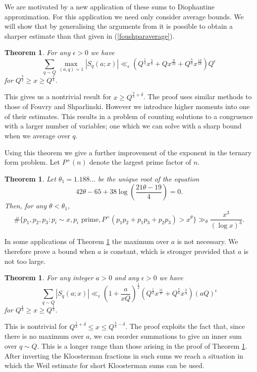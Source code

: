\documentclass[12pt]{article}
\newtheorem{thm}[defn]{Theorem}
\begin{document}
We are motivated by a new application of these sums to Diophantine
approximation.  For this application we need only consider average
bounds.  We will show that by generalising the arguments from
\cite{foushpar} it is possible to obtain a sharper estimate than that
given in (\ref{foushparaverage}).
\begin{thm}\label{thm1}
For any $\epsilon>0$ we have 
$$\sum_{q\sim Q}\max_{(a,q)=1}|S_q(a;x)|\ll_\epsilon (Q^{\frac54}x^{\frac58}+Qx^{\frac{9}{10}}+Q^{\frac76}x^{\frac{13}{18}})Q^\epsilon$$
for $Q^{\frac32}\geq x\geq Q^{\frac23}$.  
\end{thm}

This gives us a nontrivial result for $x\geq Q^{\frac23+\delta}$.  The
proof uses similar methods to those of Fouvry and Shparlinski.
However we introduce higher moments into
one of their estimates.  This results in a problem of counting solutions to a congruence with a larger number of variables; one which we  can solve with a sharp bound when we average over $q$.

Using this theorem we give a further improvement of the exponent in the ternary form problem.  Let $P^+(n)$ denote the largest prime factor of $n$.

\begin{thm}\label{ternary}
Let $\theta_1=1.188\ldots$ be the unique root of the equation 
$$42\theta-65+38\log\left(\frac{21\theta-19}{4}\right)=0.$$
Then, for any $\theta<\theta_1$,
$$\#\{p_1,p_2,p_3:p_i\sim x,p_i\text{ prime},P^+(p_1p_2+p_1p_3+p_2p_3)>x^\theta\}\gg_\theta \frac{x^3}{(\log x)^3}.$$
\end{thm}

In some applications of Theorem \ref{thm1} the maximum over $a$ is not necessary.  We
therefore prove a bound when $a$ is constant, which is stronger provided that $a$ is not too large.

\begin{thm}\label{thm2}
For any integer $a>0$ and any $\epsilon>0$ we have 
$$\sum_{q\sim Q}|S_q(a;x)|\ll_\epsilon (1+\frac{a}{xQ})^{\frac12}(Q^{\frac12}x^{\frac{11}{8}}+Q^{\frac76}x^{\frac23})(aQ)^\epsilon$$ 
for $Q^{\frac43}\geq x\geq Q^{\frac12}$.
\end{thm}
This is nontrivial for $Q^{\frac12+\delta}\leq 
x\leq Q^{\frac43-\delta}$.  The proof exploits the fact that, since there is no maximum over $a$, we can reorder summations to give an inner sum over $q\sim Q$.  This is a longer range than those arising in the proof of Theorem \ref{thm1}.  After inverting the Kloosterman fractions in such sums we reach a situation in which the Weil estimate for short Kloosterman sums can be used.
\end{document}
